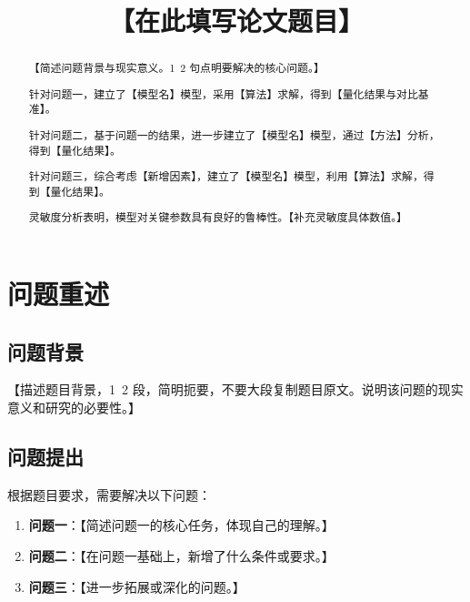 \documentclass[withoutpreface,bwprint]{cumcmthesis}
\title{【在此填写论文题目】}
\begin{document}
\maketitle

\begin{abstract}

    【简述问题背景与现实意义。1~2 句点明要解决的核心问题。】

    针对问题一，建立了【模型名】模型，采用【算法】求解，得到【量化结果与对比基准】。

    针对问题二，基于问题一的结果，进一步建立了【模型名】模型，通过【方法】分析，得到【量化结果】。

    针对问题三，综合考虑【新增因素】，建立了【模型名】模型，利用【算法】求解，得到【量化结果】。

    灵敏度分析表明，模型对关键参数具有良好的鲁棒性。【补充灵敏度具体数值。】

\end{abstract}


\section{问题重述}

\subsection{问题背景}

【描述题目背景，1~2 段，简明扼要，不要大段复制题目原文。说明该问题的现实意义和研究的必要性。】

\subsection{问题提出}

根据题目要求，需要解决以下问题：

\begin{enumerate}
    \item \textbf{问题一}：【简述问题一的核心任务，体现自己的理解。】
    \item \textbf{问题二}：【在问题一基础上，新增了什么条件或要求。】
    \item \textbf{问题三}：【进一步拓展或深化的问题。】
\end{enumerate}
\end{document}
